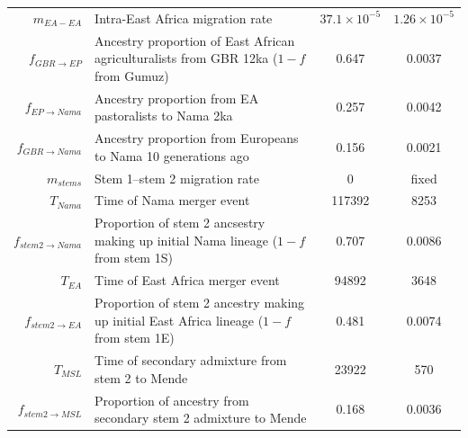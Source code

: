 \documentclass[]{article}
\begin{document}
\begin{table}[ht]
\begin{tabular}[t]{rP{8cm}cc}
    $m_{EA-EA}$ & Intra-East Africa migration rate & $37.1\times10^{-5}$ & $1.26\times10^{-5}$ \\
    $f_{GBR \rightarrow EP}$ & Ancestry proportion of East African agriculturalists from GBR 12ka ($1-f$ from Gumuz) & 0.647 & 0.0037 \\
    $f_{EP \rightarrow Nama}$ & Ancestry proportion from EA pastoralists to Nama 2ka & 0.257 & 0.0042 \\
    $f_{GBR \rightarrow Nama}$ & Ancestry proportion from Europeans to Nama 10 generations ago & 0.156 & 0.0021 \\
    $m_{stems}$ & Stem 1--stem 2 migration rate & $0$ & fixed \\
    $T_{Nama}$ & Time of Nama merger event & 117392 & 8253 \\
    $f_{stem 2 \rightarrow Nama}$ & Proportion of stem 2 ancsestry making up initial Nama lineage ($1-f$ from stem 1S) & 0.707 & 0.0086 \\
    $T_{EA}$ & Time of East Africa merger event & 94892 & 3648 \\
    $f_{stem 2 \rightarrow EA}$ & Proportion of stem 2 ancestry making up initial East Africa lineage ($1-f$ from stem 1E) & 0.481 & 0.0074 \\
    $T_{MSL}$ & Time of secondary admixture from stem 2 to Mende & 23922 & 570 \\
    $f_{stem 2 \rightarrow MSL}$ & Proportion of ancestry from secondary stem 2 admixture to Mende & 0.168 & 0.0036 \\
    \bottomrule
\end{tabular}
\end{table}
\end{document}
